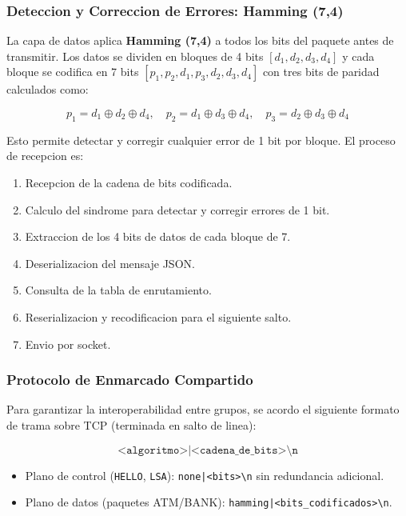 ﻿\documentclass[12pt, a4paper]{article}
\begin{document}
\subsubsection{Deteccion y Correccion de Errores: Hamming (7,4)}

La capa de datos aplica \textbf{Hamming (7,4)} a todos los bits del paquete
antes de transmitir. Los datos se dividen en bloques de 4 bits $[d_1, d_2,
d_3, d_4]$ y cada bloque se codifica en 7 bits $[p_1, p_2, d_1, p_3, d_2,
d_3, d_4]$ con tres bits de paridad calculados como:

\[
p_1 = d_1 \oplus d_2 \oplus d_4, \quad
p_2 = d_1 \oplus d_3 \oplus d_4, \quad
p_3 = d_2 \oplus d_3 \oplus d_4
\]

Esto permite detectar y corregir cualquier error de 1 bit por bloque. El
proceso de recepcion es:

\begin{enumerate}
    \item Recepcion de la cadena de bits codificada.
    \item Calculo del sindrome para detectar y corregir errores de 1 bit.
    \item Extraccion de los 4 bits de datos de cada bloque de 7.
    \item Deserializacion del mensaje JSON.
    \item Consulta de la tabla de enrutamiento.
    \item Reserializacion y recodificacion para el siguiente salto.
    \item Envio por socket.
\end{enumerate}

\subsubsection{Protocolo de Enmarcado Compartido}

Para garantizar la interoperabilidad entre grupos, se acordo el siguiente
formato de trama sobre TCP (terminada en salto de linea):

\[
\texttt{<algoritmo>|<cadena\_de\_bits>\textbackslash n}
\]

\begin{itemize}
    \item Plano de control (\texttt{HELLO}, \texttt{LSA}):
          \texttt{none|<bits>\textbackslash n} sin redundancia adicional.
    \item Plano de datos (paquetes ATM/BANK):
          \texttt{hamming|<bits\_codificados>\textbackslash n}.
\end{itemize}
\end{document}
